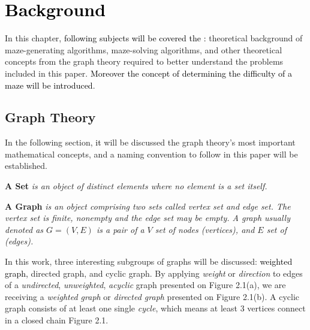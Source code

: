 \chapter{\textcolor{black}{Background}}\label{cha: Background}
In this chapter, \textcolor{black}{following subjects will be covered the :} theoretical background of maze-generating algorithms, maze-solving algorithms,
and other theoretical concepts from the graph theory required to better understand the problems included in this paper. \textcolor{black}{Moreover the concept of determining the difficulty
of a maze will be introduced}. 
\section{Graph Theory}\label{sec:theoreticalBackground}
In the following section, \textcolor{black}{it} will be discussed the graph theory's most important mathematical concepts, and a naming convention to follow in this paper will be established. 
\begin{definition}\textbf{A Set} \emph{is an object of distinct elements where no element is a set itself.\cite{Trudeau, 2017} }\end{definition}
\begin{definition}\textbf{A Graph} \emph{is an object comprising two sets called vertex set and edge set. The vertex set is finite, nonempty and the edge set may be empty. A graph usually denoted as $ G = (V, E)$ is a pair of a $V$ set of nodes (\textit{vertices}), and $E$ set of (\textit{edges}).\cite{Trudeau, 2017} }\end{definition}
\noindent In this work, three interesting subgroups of graphs will be discussed: \textcolor{black}{weighted graph,} directed graph, and cyclic graph. By applying \textit{weight} or \textit{direction} to edges of a \textit{undirected}, \textit{unweighted}, \textit{acyclic} graph presented on Figure 2.1(a), we are receiving a \textit{ weighted graph} or \textit{directed graph} presented on Figure 2.1(b). A cyclic graph consists of at least one single \textit{cycle}, which means at least 3 vertices connect in a closed chain Figure 2.1. 
